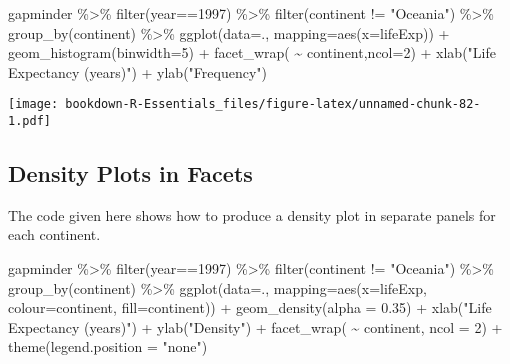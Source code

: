 \documentclass[
]{book}
\newenvironment{Shaded}{\begin{snugshade}}{\end{snugshade}}
\newcommand{\AttributeTok}[1]{\textcolor[rgb]{0.77,0.63,0.00}{#1}}
\newcommand{\DecValTok}[1]{\textcolor[rgb]{0.00,0.00,0.81}{#1}}
\newcommand{\FloatTok}[1]{\textcolor[rgb]{0.00,0.00,0.81}{#1}}
\newcommand{\FunctionTok}[1]{\textcolor[rgb]{0.00,0.00,0.00}{#1}}
\newcommand{\NormalTok}[1]{#1}
\newcommand{\SpecialCharTok}[1]{\textcolor[rgb]{0.00,0.00,0.00}{#1}}
\newcommand{\StringTok}[1]{\textcolor[rgb]{0.31,0.60,0.02}{#1}}
\begin{document}
\begin{Shaded}
\begin{Highlighting}[]
\NormalTok{gapminder }\SpecialCharTok{\%\textgreater{}\%} 
  \FunctionTok{filter}\NormalTok{(year}\SpecialCharTok{==}\DecValTok{1997}\NormalTok{) }\SpecialCharTok{\%\textgreater{}\%} 
  \FunctionTok{filter}\NormalTok{(continent }\SpecialCharTok{!=} \StringTok{"Oceania"}\NormalTok{) }\SpecialCharTok{\%\textgreater{}\%} 
  \FunctionTok{group\_by}\NormalTok{(continent) }\SpecialCharTok{\%\textgreater{}\%}
\FunctionTok{ggplot}\NormalTok{(}\AttributeTok{data=}\NormalTok{., }\AttributeTok{mapping=}\FunctionTok{aes}\NormalTok{(}\AttributeTok{x=}\NormalTok{lifeExp)) }\SpecialCharTok{+} 
  \FunctionTok{geom\_histogram}\NormalTok{(}\AttributeTok{binwidth=}\DecValTok{5}\NormalTok{) }\SpecialCharTok{+} 
  \FunctionTok{facet\_wrap}\NormalTok{( }\SpecialCharTok{\textasciitilde{}}\NormalTok{ continent,}\AttributeTok{ncol=}\DecValTok{2}\NormalTok{) }\SpecialCharTok{+} 
  \FunctionTok{xlab}\NormalTok{(}\StringTok{"Life Expectancy (years)"}\NormalTok{) }\SpecialCharTok{+}
  \FunctionTok{ylab}\NormalTok{(}\StringTok{"Frequency"}\NormalTok{)}
\end{Highlighting}
\end{Shaded}

\texttt{[image: bookdown-R-Essentials\_files/figure-latex/unnamed-chunk-82-1.pdf]}

\hypertarget{density-plots-in-facets}{%
\subsection{Density Plots in Facets}\label{density-plots-in-facets}}

The code given here shows how to produce a density plot in separate panels for each continent.

\begin{Shaded}
\begin{Highlighting}[]
\NormalTok{gapminder }\SpecialCharTok{\%\textgreater{}\%} 
  \FunctionTok{filter}\NormalTok{(year}\SpecialCharTok{==}\DecValTok{1997}\NormalTok{) }\SpecialCharTok{\%\textgreater{}\%} 
  \FunctionTok{filter}\NormalTok{(continent }\SpecialCharTok{!=} \StringTok{"Oceania"}\NormalTok{) }\SpecialCharTok{\%\textgreater{}\%} 
  \FunctionTok{group\_by}\NormalTok{(continent) }\SpecialCharTok{\%\textgreater{}\%}
\FunctionTok{ggplot}\NormalTok{(}\AttributeTok{data=}\NormalTok{., }\AttributeTok{mapping=}\FunctionTok{aes}\NormalTok{(}\AttributeTok{x=}\NormalTok{lifeExp, }\AttributeTok{colour=}\NormalTok{continent, }\AttributeTok{fill=}\NormalTok{continent)) }\SpecialCharTok{+} 
  \FunctionTok{geom\_density}\NormalTok{(}\AttributeTok{alpha =} \FloatTok{0.35}\NormalTok{) }\SpecialCharTok{+} 
  \FunctionTok{xlab}\NormalTok{(}\StringTok{"Life Expectancy (years)"}\NormalTok{) }\SpecialCharTok{+}
  \FunctionTok{ylab}\NormalTok{(}\StringTok{"Density"}\NormalTok{) }\SpecialCharTok{+}
  \FunctionTok{facet\_wrap}\NormalTok{( }\SpecialCharTok{\textasciitilde{}}\NormalTok{ continent, }\AttributeTok{ncol =} \DecValTok{2}\NormalTok{) }\SpecialCharTok{+}  
  \FunctionTok{theme}\NormalTok{(}\AttributeTok{legend.position =} \StringTok{"none"}\NormalTok{)}
\end{Highlighting}
\end{Shaded}
\end{document}
